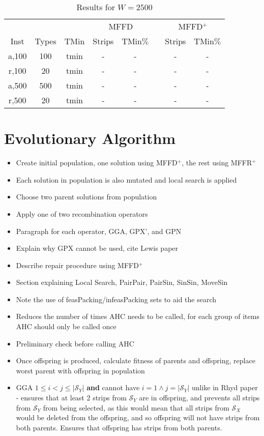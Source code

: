 \documentclass{elsarticle}
\begin{document}
\begin{table}[h!]
	\centering
	\caption{Results for $W=2500$}
	\begin{tabular}{cccccccc}\toprule
		& & &\multicolumn{2}{c}{MFFD} &\phantom{a}& \multicolumn{2}{c}{MFFD$^+$}\\
		\cmidrule{4-5} \cmidrule{7-8}
		Inst & Types &TMin & Strips & TMin$\%$ && Strips & TMin$\%$\\ \midrule	
		a,100 & 100 & tmin & - & - && - & - \\
		r,100 & 20 & tmin & - & - && - & -\\
		\midrule
		a,500 & 500 & tmin & - & - && - & -\\
		r,500 & 20 & tmin & - & - && - & -\\
		\bottomrule
	\end{tabular}	
	\label{table:MFFD2500}
\end{table}


\section{Evolutionary Algorithm}
\begin{itemize}
	\item Create initial population, one solution using MFFD$^+$, the rest using MFFR$^+$
	\item Each solution in population is also mutated and local search is applied
	\item Choose two parent solutions from population
	\item Apply one of two recombination operators
	\item Paragraph for each operator, GGA, GPX', and GPN
	\item Explain why GPX cannot be used, cite Lewis paper
	\item Describe repair procedure using MFFD$^+$
	\item Section explaining Local Search, PairPair, PairSin, SinSin, MoveSin
	\item Note the use of feasPacking/infeasPacking sets to aid the search
	\item Reduces the number of times AHC needs to be called, for each group of items AHC should only be called once
	\item Preliminary check before calling AHC
	\item Once offspring is produced, calculate fitness of parents and offspring, replace worst parent with offspring in population
	\item GGA $1 \leq i < j \leq |\mathcal{S}_Y|$ \textbf{and} cannot have $i = 1 \land j = |\mathcal{S}_Y|$ unlike in Rhyd paper - ensures that at least 2 strips from $\mathcal{S}_Y$ are in offspring, and prevents all strips from $\mathcal{S}_Y$ from being selected, as this would mean that all strips from $\mathcal{S}_X$ would be deleted from the offspring, and so offspring will not have strips from both parents. Ensures that offspring has strips from both parents.
\end{itemize}
\end{document}
